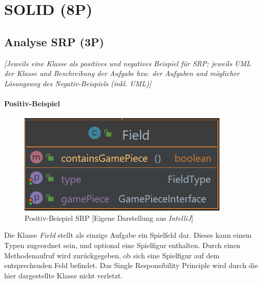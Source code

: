 
\titlespacing*{\chapter}{0pt}{-30mm}{10pt}
  
\chapter{SOLID (8P)}
\pagestyle{scrheadings}
\clearscrheadfoot
{}
\setcounter{page}{8}
\ofoot[\pagemark]{\pagemark}
\onehalfspacing

\section{Analyse SRP (3P)}
\emph{[Jeweils eine Klasse als positives und negatives Beispiel für SRP; jeweils UML der Klasse und
Beschreibung der Aufgabe bzw. der Aufgaben und möglicher Lösungsweg des Negativ-Beispiels (inkl.
UML)]}

\subsubsection{Positiv-Beispiel}
\begin{figure}[htbp]
\centering
\centerline{\includegraphics[scale=.6]{positivbeispiel_srp}}
\caption{Positiv-Beispiel SRP [Eigene Darstellung aus \emph{IntelliJ}]}
\label{fig:positivbeispiel_srp}
\end{figure}
\noindent Die Klasse \emph{Field} stellt als einzige Aufgabe ein Spielfeld dar. Dieses kann einem Typen zugeordnet sein, und optional eine Spielfigur enthalten. Durch einen Methodenaufruf wird zurückgegeben, ob sich eine Spielfigur auf dem entsprechenden Feld befindet. Das Single Responsibility Principle wird durch die hier dargestellte Klasse nicht verletzt.


